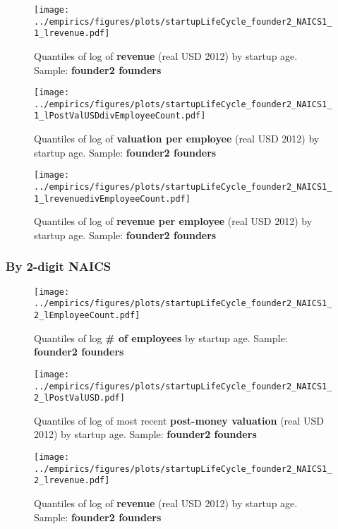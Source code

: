 \documentclass[12pt,english]{article}
\theoremstyle{remark}
\let\Oldsubsubsection\subsubsection
\renewcommand{\subsubsection}{\FloatBarrier\Oldsubsubsection}
\begin{document}
\begin{figure}[!htb]
	\centering
	\texttt{[image: ../empirics/figures/plots/startupLifeCycle\_founder2\_NAICS1\_1\_lrevenue.pdf]}
	\caption{Quantiles of log of \textbf{revenue} (real USD 2012) by startup age. 
		Sample: \textbf{founder2 founders}}
\end{figure}

\begin{figure}[!htb]
	\centering
	\texttt{[image: ../empirics/figures/plots/startupLifeCycle\_founder2\_NAICS1\_1\_lPostValUSDdivEmployeeCount.pdf]}
	\caption{Quantiles of log of \textbf{valuation per employee} (real USD 2012) by startup age. 
		Sample: \textbf{founder2 founders}}
\end{figure}

\begin{figure}[!htb]
	\centering
	\texttt{[image: ../empirics/figures/plots/startupLifeCycle\_founder2\_NAICS1\_1\_lrevenuedivEmployeeCount.pdf]}
	\caption{Quantiles of log of \textbf{revenue per employee} (real USD 2012) by startup age. 
		Sample: \textbf{founder2 founders}}
\end{figure}

\subsubsection{By 2-digit NAICS}

\begin{figure}[!htb]
	\centering
	\texttt{[image: ../empirics/figures/plots/startupLifeCycle\_founder2\_NAICS1\_2\_lEmployeeCount.pdf]}
	\caption{Quantiles of log \textbf{\# of employees} by startup age. 
		Sample: \textbf{founder2 founders}}
\end{figure}

\begin{figure}[!htb]
	\centering
	\texttt{[image: ../empirics/figures/plots/startupLifeCycle\_founder2\_NAICS1\_2\_lPostValUSD.pdf]}
	\caption{Quantiles of log of most recent \textbf{post-money valuation} (real USD 2012) by startup age. 
		Sample: \textbf{founder2 founders}}
\end{figure}

\begin{figure}[!htb]
	\centering
	\texttt{[image: ../empirics/figures/plots/startupLifeCycle\_founder2\_NAICS1\_2\_lrevenue.pdf]}
	\caption{Quantiles of log of \textbf{revenue} (real USD 2012) by startup age. 
		Sample: \textbf{founder2 founders}}
\end{figure}
\end{document}
